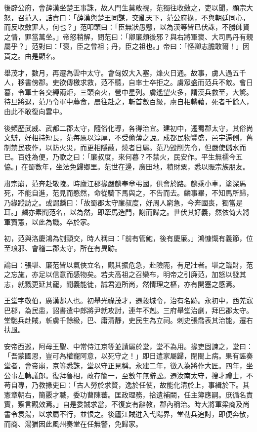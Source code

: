 \begin{pinyinscope}
後辟公府，會薛漢坐楚王事誅，故人門生莫敢視，范獨往收斂之，吏以聞，顯宗大怒，召范入，詰責曰：「薛漢與楚王同謀，交亂天下，范公府掾，不與朝廷同心，而反收斂罪人，何也？」范叩頭曰：「臣無狀愚戇，以為漢等皆已伏誅，不勝師資之情，罪當萬坐。」帝怒稍解，問范曰：「卿廉頗後邪？與右將軍褒、大司馬丹有親屬乎？」范對曰：「褒，臣之曾祖；丹，臣之祖也。」帝曰：「怪卿志膽敢爾！」因貰之。由是顯名。

舉茂才，數月，再遷為雲中太守。會匈奴大入塞，烽火日通。故事，虜人過五千人，移書傍郡。吏欲傳檄求救，范不聽，自率士卒拒之。虜眾盛而范兵不敵。會日暮，令軍士各交縛兩炬，三頭奋火，營中星列。虜遙望火多，謂漢兵救至，大驚。待旦將退，范乃令軍中蓐食，晨往赴之，斬首數百級，虜自相轔藉，死者千餘人，由此不敢復向雲中。

後頻歷武威、武都二郡太守，隨俗化導，各得治宜。建初中，遷蜀郡太守，其俗尚文辯，好相持短長，范每厲以淳厚，不受偷薄之說。成都民物豐盛，邑宇逼側，舊制禁民夜作，以防火災，而更相隱蔽，燒者日屬。范乃毀削先令，但嚴使儲水而已。百姓為便，乃歌之曰：「廉叔度，來何暮？不禁火，民安作。平生無襦今五恊。」在蜀數年，坐法免歸鄉里。范世在邊，廣田地，積財粟，悉以賑宗族朋友。

肅宗崩，范奔赴敬陵。時廬江郡掾嚴麟奉章弔國，俱會於路。麟乘小車，塗深馬死，不能自進，范見而愍然，命從騎下馬與之，不告而去。麟事畢，不知馬所歸，乃緣蹤訪之。或謂麟曰：「故蜀郡太守廉叔度，好周人窮急，今奔國喪，獨當是耳。」麟亦素聞范名，以為然，即牽馬造門，謝而歸之。世伏其好義，然依倚大將軍竇憲，以此為譏。卒於家。

初，范與洛慶鴻為刎頸交，時人稱曰：「前有管鮑，後有慶廉。」鴻慷慨有義節，位至琅邪、會稽二郡太守，所在有異跡。

論曰：張堪、廉范皆以氣俠立名，觀其振危急，赴險阨，有足壯者。堪之臨財，范之忘施，亦足以信意而感物矣。若夫高祖之召欒布，明帝之引廉范，加怒以發其志，就戮更延其寵，聞義能徙，誠君道所尚，然情理之樞，亦有開塞之感焉。

王堂字敬伯，廣漢郪人也。初舉光祿茂才，遷穀城令，治有名跡。永初中，西羌寇巴郡，為民患，詔書遣中郎將尹就攻討，連年不剋。三府舉堂治劇，拜巴郡太守。堂馳兵赴賊，斬虜千餘級，巴、庸清靜，吏民生為立祠。刺史張喬表其治能，遷右扶風。

安帝西巡，阿母王聖、中常侍江京等並請屬於堂，堂不為用。掾吏固諫之，堂曰：「吾蒙國恩，豈可為權寵阿意，以死守之！」即日遣家屬歸，閉閤上病。果有誣奏堂者，會帝崩，京等悉誅，堂以守正見稱。永建二年，徵入為將作大匠。四年，坐公事左轉議郎。復拜魯相，政存簡一，至數年無辭訟。遷汝南太守，搜才禮士，不苟自專，乃教掾吏曰：「古人勞於求賢，逸於任使，故能化清於上，事緝於下。其憲章朝右，簡覈才職，委功曹陳蕃。匡政理務，拾遺補闕，任主簿應嗣。庶循名責實，察言觀效焉。」自是委誠求當，不復妄有辭教，郡內稱治。時大將軍梁商及尚書令袁湯，以求屬不行，並恨之。後廬江賊迸入弋陽界，堂勒兵追討，即便奔散，而商、湯猶因此風州奏堂在任無警，免歸家。


\end{pinyinscope}
